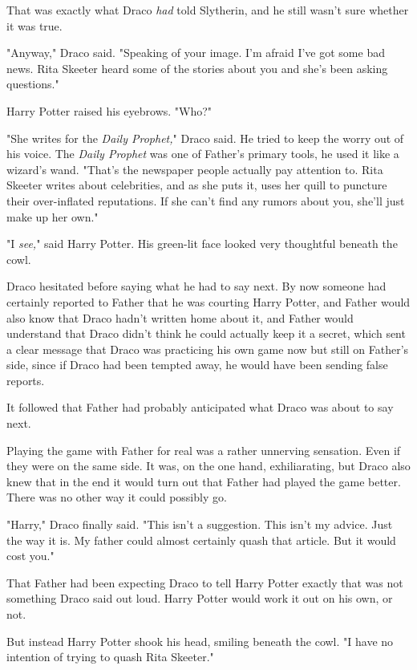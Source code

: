 That was exactly what Draco \emph{had} told Slytherin, and he still wasn't sure 
whether it was true.

"Anyway," Draco said. "Speaking of your image. I'm afraid I've got some bad 
news. Rita Skeeter heard some of the stories about you and she's been asking 
questions."

Harry Potter raised his eyebrows. "Who?"

"She writes for the \emph{Daily Prophet,}" Draco said. He tried to keep the 
worry out of his voice. The \emph{Daily Prophet} was one of Father's primary 
tools, he used it like a wizard's wand. "That's the newspaper people actually 
pay attention to. Rita Skeeter writes about celebrities, and as she puts it, 
uses her quill to puncture their over-inflated reputations. If she can't find 
any rumors about you, she'll just make up her own."

"I \emph{see,}" said Harry Potter. His green-lit face looked very thoughtful 
beneath the cowl.

Draco hesitated before saying what he had to say next. By now someone had 
certainly reported to Father that he was courting Harry Potter, and Father 
would also know that Draco hadn't written home about it, and Father would 
understand that Draco didn't think he could actually keep it a secret, which 
sent a clear message that Draco was practicing his own game now but still on 
Father's side, since if Draco had been tempted away, he would have been sending 
false reports.

It followed that Father had probably anticipated what Draco was about to say 
next.

Playing the game with Father for real was a rather unnerving sensation. Even if 
they were on the same side. It was, on the one hand, exhiliarating, but Draco 
also knew that in the end it would turn out that Father had played the game 
better. There was no other way it could possibly go.

"Harry," Draco finally said. "This isn't a suggestion. This isn't my advice. 
Just the way it is. My father could almost certainly quash that article. But it 
would cost you."

That Father had been expecting Draco to tell Harry Potter exactly that was not 
something Draco said out loud. Harry Potter would work it out on his own, or 
not.

But instead Harry Potter shook his head, smiling beneath the cowl. "I have no 
intention of trying to quash Rita Skeeter."

